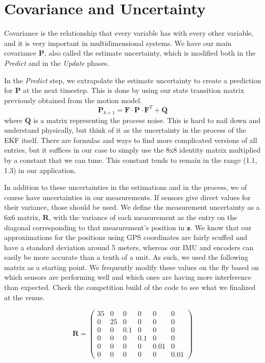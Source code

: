 \section{Covariance and Uncertainty}

Covariance is the relationship that every variable has with every other variable, and it is very important in multidimensional systems. We have our main covariance $\boldsymbol{P}$, also called the estimate uncertainty, which is modified both in the \textit{Predict} and in the \textit{Update} phases. 

In the \textit{Predict} step, we extrapolate the estimate uncertainty to create a prediction for $\boldsymbol{P}$ at the next timestep. This is done by using our state transition matrix previously obtained from the motion model. 
\begin{equation}
    \boldsymbol{P}_{k+1} = \boldsymbol{F} \cdot \boldsymbol{P} \cdot \boldsymbol{F}^T + \boldsymbol{Q}
\end{equation}
where $\boldsymbol{Q}$ is a matrix representing the process noise. This is hard to nail down and understand physically, but think of it as the uncertainty in the process of the EKF itself. There are formulas and ways to find more complicated versions of all entries, but it suffices in our case to simply use the 8x8 identity matrix multiplied by a constant that we can tune. This constant tends to remain in the range (1.1, 1.3) in our application.

In addition to these uncertainties in the estimations and in the process, we of course have uncertainties in our measurements. If sensors give direct values for their variance, those should be used. We define the measurement uncertainty as a 6x6 matrix, $\boldsymbol{R}$, with the variance of each measurement as the entry on the diagonal corresponding to that measurement's position in $\boldsymbol{z}$. We know that our approximations for the positions using GPS coordinates are fairly scuffed and have a standard deviation around 5 meters, whereas our IMU and encoders can easily be more accurate than a tenth of a unit. As such, we used the following matrix as a starting point. We frequently modify these values on the fly based on which sensors are performing well and which ones are having more interference than expected. Check the competition build of the code to see what we finalized at the venue.

\begin{equation}
    \boldsymbol{R} = 
    \begin{pmatrix}
    35 & 0 & 0 & 0 & 0 & 0 \\
    0 & 25 & 0 & 0 & 0 & 0 \\
    0 & 0 & 0.1 & 0 & 0 & 0 \\
    0 & 0 & 0 & 0.1 & 0 & 0 \\
    0 & 0 & 0 & 0 & 0.01 & 0 \\
    0 & 0 & 0 & 0 & 0 & 0.01
    \end{pmatrix}
\end{equation}

